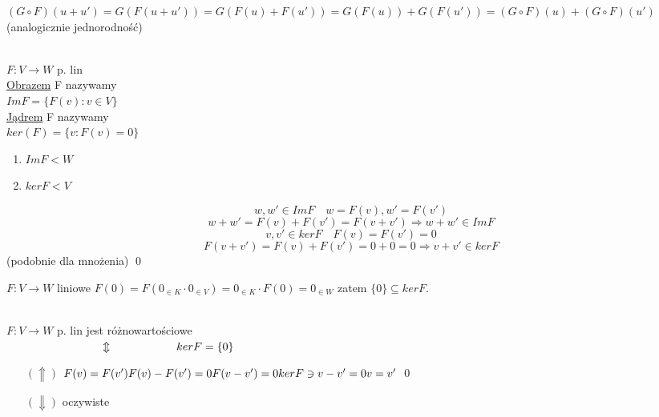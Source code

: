 \begin{dd}
    $(G \circ F)(u+u') = G(F(u+u')) = G(F(u) + F(u')) = G(F(u)) + G(F(u')) = (G \circ F)(u) + (G \circ F)(u') $ (analogicznie jednorodność)
\end{dd}

\begin{df} ~\\
    $F: V \rightarrow W $ p. lin \\
    \underline{Obrazem} F nazywamy \\
    $Im F = \{ F(v): v \in V\}$ \\
    \underline{Jądrem} F nazywamy \\
    $ker(F) = \{v: F(v) = 0\}$
\end{df} 
\begin{ft} \hfill 
    \begin{enumerate}[{(}1{)}]
        \item $Im F < W$
        \item $kerF < V$
    \end{enumerate}
\end{ft}

\begin{dd} 
    $$w,w' \in Im F \quad w=F(v), w'=F(v')$$ 
    $$w+w' = F(v) + F(v') = F(v+v') \Rightarrow w+w' \in ImF $$
    \vspace{5mm}
    $$v,v' \in ker F \quad F(v) = F(v') = 0$$
    $$F(v+v') = F(v) + F(v') = 0 + 0 = 0 \Rightarrow v+v' \in ker F$$ 
    \hfill (podobnie dla mnożenia) \qed
\end{dd}

\begin{uw}
    $F: V \rightarrow W $ liniowe
    $F(0) = F(0_{\in K}\cdot 0_{\in V}) = 0_{\in K} \cdot F(0) = 0_{\in W}$ 
    zatem $\{0\} \subseteq ker F$.
\end{uw}

\begin{ft} 
    ~\\
    $F: V \rightarrow W $ p. lin jest różnowartościowe \\
    $ \hspace*{30mm} \Updownarrow \\
        \hspace*{20mm} ker F = \{ 0 \}
    $
\end{ft}

\begin{dd} \hfill
    \begin{itemize}
        \item[$(\Uparrow)$] $F(v) = F(v') \\ 
            F(v)-F(v') = 0 \\
            F(v-v') = 0 \\
            ker F \ni v-v' = 0 \\
            v = v' 
        $ \qed
        \item[$(\Downarrow)$] oczywiste
    \end{itemize}
\end{dd}

